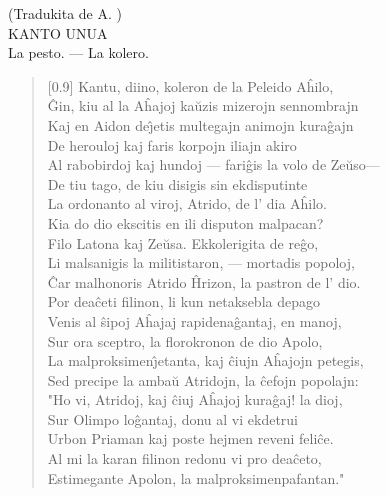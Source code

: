 \begin{center}
\footnotesize (Tradukita de A. )\\[2ex]

{\large KANTO UNUA}\\[2ex]
\footnotesize La pesto. --- La kolero.
\end{center}

\begin{verse}[0.9\textwidth]
          Kantu, diino, koleron de la Peleido A\^hilo,\\
          \^Gin, kiu al la A\^hajoj ka\u uzis mizerojn sennombrajn\\
          Kaj en Aidon de\^{\j}etis multegajn animojn kura\^gajn\\
          De herouloj kaj faris korpojn iliajn akiro\\
          Al rabobirdoj kaj hundoj --- fari\^gis la volo de Ze\u uso---\\
          De tiu tago, de kiu disigis sin ekdisputinte\\
          La ordonanto al viroj, Atrido, de l' dia A\^hilo.\\
           \vin  Kia do dio ekscitis en ili disputon malpacan?\\
          Filo Latona kaj Ze\u usa. Ekkolerigita de re\^go,\\
          Li malsanigis la militistaron, --- mortadis popoloj,\\
          \^Car malhonoris Atrido \^Hrizon, la pastron de l' dio.\\
          Por dea\^ceti filinon, li kun netaksebla depago\\
          Venis al \^sipoj A\^hajaj rapidena\^gantaj, en manoj,\\
          Sur ora sceptro, la florokronon de dio Apolo,\\
          La malproksimen\^{\j}etanta, kaj \^ciujn A\^hajojn petegis,\\
          Sed precipe la amba\u u Atridojn, la \^cefojn popolajn:\\
           \vin  "Ho vi, Atridoj, kaj \^ciuj A\^hajoj kura\^gaj! la dioj,\\
          Sur Olimpo lo\^gantaj, donu al vi ekdetrui\\
          Urbon Priaman kaj poste hejmen reveni feli\^ce.\\
          Al mi la karan filinon redonu vi pro dea\^ceto,\\
          Estimegante Apolon, la malproksimenpafantan."\\

\end{verse}
